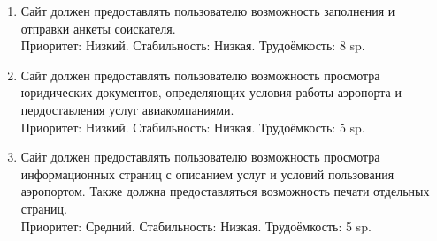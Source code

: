\begin{enumerate}
      \item Сайт должен предоставлять пользователю возможность
            заполнения и отправки анкеты соискателя. \\
            Приоритет: Низкий. Стабильность: Низкая. Трудоёмкость: 8 sp.

      \item Сайт должен предоставлять пользователю возможность
            просмотра юридических документов, определяющих
            условия работы аэропорта и пердоставления
            услуг авиакомпаниями. \\
            Приоритет: Низкий. Стабильность: Низкая. Трудоёмкость: 5 sp.

      \item Сайт должен предоставлять пользователю возможность просмотра
            информационных страниц с описанием услуг и
            условий пользования аэропортом. Также должна
            предоставляться возможность печати отдельных
            страниц. \\
            Приоритет: Средний. Стабильность: Низкая. Трудоёмкость: 5 sp.

\end{enumerate}
